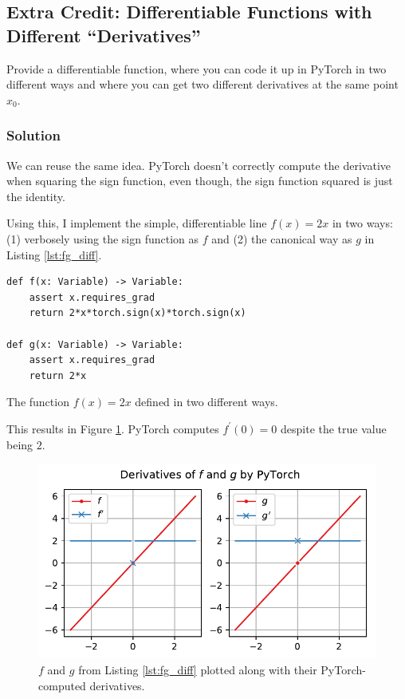 \documentclass[letterpaper,11pt]{article}
\begin{document}
\subsection*{Extra Credit: Differentiable Functions with Different ``Derivatives''}

Provide a differentiable function, where you can code it up in PyTorch
in two different ways and where you can get two different derivatives
at the same point $x_0$.

\subsubsection*{Solution}

We can reuse the same idea. PyTorch doesn't correctly compute the
derivative when squaring the sign function, even though, the sign
function squared is just the identity.

Using this, I implement the simple, differentiable line $f(x) = 2x$ in
two ways: (1) verbosely using the sign function as $f$ and (2) the
canonical way as $g$ in Listing \ref{lst:fg_diff}.

\begin{listing}
\begin{verbatim}
def f(x: Variable) -> Variable:
    assert x.requires_grad
    return 2*x*torch.sign(x)*torch.sign(x)

def g(x: Variable) -> Variable:
    assert x.requires_grad
    return 2*x
\end{verbatim}
  \caption{The function $f(x) = 2x$ defined in two different ways.}
\label{lst:fg_diff}
\end{listing}

This results in Figure \ref{fig:problem4_differentiable}. PyTorch
computes $f^\prime(0) = 0$ despite the true value being $2$.

\begin{figure}[h]
  \centering
  \includegraphics{problem4/problem4_differentiable.pdf}
  \caption{$f$ and $g$ from Listing \ref{lst:fg_diff} plotted along with
    their PyTorch-computed derivatives.}
  \label{fig:problem4_differentiable}
\end{figure}
\end{document}
